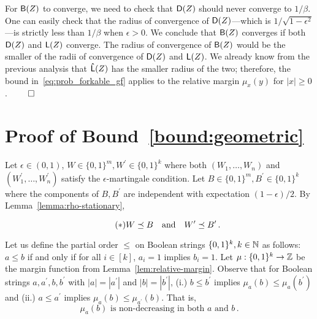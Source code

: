   For $\mathsf{B}(Z)$ to converge, we need to check that $\mathsf{D}(Z)$
  should never converge to $1/\beta$.  One can easily check that
  the radius of convergence of $\mathsf{D}(Z)$---which is
  $\displaystyle 1/\sqrt{1-\epsilon^2}$---is strictly less than $1/\beta$ when
  $\epsilon > 0$.  We conclude that $\mathsf{B}(Z)$ converges if
  both $\mathsf{D}(Z)$ and $\mathsf{L}(Z)$ converge.  The radius of
  convergence of $\mathsf{B}(Z)$ would be the smaller of the radii
  of convergence of $\mathsf{D}(Z)$ and $\mathsf{L}(Z)$.  We already
  know from the previous analysis that $\mathsf{\hat{L}}(Z)$ has the
  smaller radius of the two; therefore, the bound
  in~\eqref{eq:prob_forkable_gf} applies to the relative margin $\mu_x(y)$
  for $|x|\geq 0$. 
  \hfill $\qed$  


\section{Proof of Bound~\ref{bound:geometric}}\label{sec:martingale-proof-new}

Let $\epsilon \in (0, 1)$,  
$W \in \{0,1\}^m, W^\prime \in \{0,1\}^k$ 
where both $(W_1, \ldots, W_n)$ and $(W^\prime_1, \ldots, W^\prime_n)$ 
satisfy the $\epsilon$-martingale condition. 
Let $B \in \{0,1\}^m, B^\prime \in \{0,1\}^k$ where the components of $B, B^\prime$ 
are independent with expectation $(1 - \epsilon)/2$.
By Lemma~\ref{lemma:rho-stationary}, 

\begin{equation*}\label{eq:WB-dominance}\tag{$*$}
  W \preceq B\quad \text{and} \quad W^\prime \preceq B^\prime
  \,. 
\end{equation*}

Let us define the partial order $\leq$ on Boolean strings $\{0,1\}^k, k \in \mathbb{N}$ 
as follows: 
$a \leq b$ if and only if
for all $i \in [k]$, $a_i = 1$ implies $b_i = 1$. 
Let $\mu : \{0,1\}^k \rightarrow \mathbb{Z}$ be the margin function 
from Lemma~\ref{lem:relative-margin}. 
Observe that for Boolean strings $a, a^\prime, b, b^\prime$ 
with $|a| = |a^\prime|$ and $|b| = |b^\prime|$, 
(i.) $b \leq b^\prime$ implies $\mu_a(b) \leq \mu_a(b^\prime)$ and 
(ii.) $a \leq a^\prime$ implies $\mu_a(b) \leq \mu_{a^\prime}(b)$. 
That is, 
\begin{equation*}\label{eq:mu-WB-dominance}\tag{$\dagger$}
  \text{$\mu_a(b)$ is non-decreasing in both $a$ and $b$}
  \,.   
\end{equation*}

